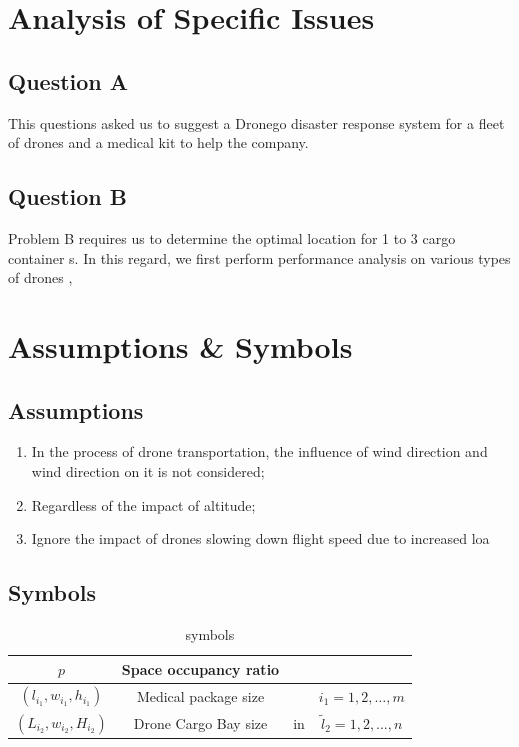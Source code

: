 \documentclass[a4paper,12pt]{article}
\begin{document}
	\section{Analysis of Specific Issues}
	\subsection{Question A}
	This
	questions asked us to suggest a Dronego disaster response system for a fleet of drones
	and a medical kit to help the company.
	\subsection{Question B}
	Problem B requires us to determine the optimal location for 1 to 3 cargo container s. In this
	regard, we first perform performance analysis on various types of drones ,
	\section{Assumptions \& Symbols}
	\subsection{Assumptions}
	\begin{enumerate}
		\item In the process of drone transportation, the influence of wind direction and wind direction
		on it is not considered;
		\item Regardless of the impact of altitude;
		\item Ignore the impact of drones slowing down flight speed due to increased loa
	\end{enumerate}
	\subsection{Symbols}
	\begin{table}[!h]
		\centering
		\caption{symbols}
		\label{tab:significance}
		\begin{tabular}{cccc}
			\toprule[0.15em]
			$p$ & Space occupancy ratio &  &  \\
			\midrule[0.3em]
			$\left(l_{i_{1}}, w_{i_{1}}, h_{i_{1}}\right)$ & Medical package size &  & $i_{1}=1,2, \ldots, m$ \\
			$\left(L_{i_{2}}, w_{i_{2}}, H_{i_{2}}\right)$ & Drone Cargo Bay size & in & $\tilde{l}_{2}=1,2, \ldots, n$ \\
			\bottomrule[0.15em]
		\end{tabular}
	\end{table}
\end{document}
